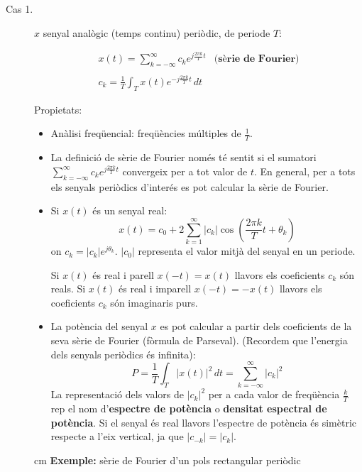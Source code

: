 \documentclass{article}
\begin{document}
\begin{description}

\item[Cas 1.] $x$ senyal anal\`ogic (temps continu) peri\`odic, de periode $T$:

\[
\begin{array}{ll}
x(t)=\displaystyle \sum_{k=-\infty}^{\infty} c_k e^{j \frac{2\pi k}{T} t} & \textbf{(s\`erie de Fourier)} \\ \\
c_k=\displaystyle \frac{1}{T} \int_T x(t) e^{-j \frac{2\pi k}{T} t} \, dt &
\end{array}
\]

\noindent
Propietats:
\begin{itemize}
\item An\`alisi freq\"uencial: freq\"u\`encies m\'ultiples de $\frac{1}{T}$.
\item La definici\'o de s\`erie de Fourier nom\'es t\'e sentit si el sumatori 
$\sum_{k=-\infty}^{\infty} c_k e^{j \frac{2\pi k}{T} t}$ convergeix per a tot valor de $t$.
En general, per a tots els senyals peri\`odics d'inter\'es es pot calcular la sèrie de Fourier.

\item Si $x(t)$ \'es un senyal real: 
\[
\displaystyle x(t)=c_0+ 2 \sum_{k=1}^\infty |c_k| \cos(\frac{2\pi k}{T} t + \theta_k)
\]
\noindent
on $c_k=|c_k|e^{j\theta_k}$. $|c_0|$ representa el valor mitj\`a del senyal en un periode.

\noindent
Si $x(t)$ \'es real i parell $x(-t)=x(t)$ llavors els coeficients $c_k$ s\'on reals. 
\noindent
Si $x(t)$ \'es real i imparell $x(-t)=-x(t)$ llavors els coeficients $c_k$ s\'on imaginaris purs. 

\item La pot\`encia del senyal $x$ es pot calcular a partir dels coeficients de la seva s\`erie de Fourier
(f\`ormula de Parseval).
(Recordem que l'energia dels senyals peri\`odics \'es infinita):
\[
P=\frac{1}{T} \int_T |x(t)|^2 \, dt = \sum_{k=-\infty}^\infty |c_k|^2
\]
\noindent
La representaci\'o dels valors de $|c_k|^2$ per a cada valor de freq\"u\`encia $\frac{k}{T}$ 
rep el nom d'\textbf{espectre de pot\`encia} o \textbf{densitat espectral de pot\`encia}.
Si el senyal \'es real llavors l'espectre de pot\`encia \'es sim\`etric respecte a l'eix vertical,
ja que $|c_{-k}| =|c_k|$. 


\end{itemize}

 cm
\noindent
\textbf{Exemple:} s\`erie de Fourier d'un pols rectangular peri\`odic


\end{description}
\end{document}
